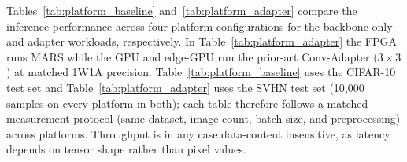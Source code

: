 \documentclass[12pt, a4paper]{report}
\numberwithin{equation}{chapter}
\numberwithin{figure}{chapter}
\numberwithin{table}{chapter}
\numberwithin{algorithm}{chapter}
\begin{document}
Tables~\ref{tab:platform_baseline} and~\ref{tab:platform_adapter} compare the inference performance across four platform configurations for the backbone-only and adapter workloads, respectively. In Table~\ref{tab:platform_adapter} the FPGA runs MARS while the GPU and edge-GPU run the prior-art Conv-Adapter ($3\times3$) at matched 1W1A precision. Table~\ref{tab:platform_baseline} uses the CIFAR-10 test set and Table~\ref{tab:platform_adapter} uses the SVHN test set (10{,}000 samples on every platform in both); each table therefore follows a matched measurement protocol (same dataset, image count, batch size, and preprocessing) across platforms. Throughput is in any case data-content insensitive, as latency depends on tensor shape rather than pixel values.

\begin{table}[H]
\centering
\caption{Backbone-Only Cross-Platform Performance (CIFAR-10, Batch 1000).}
\label{tab:platform_baseline}
\end{table}
\end{document}
